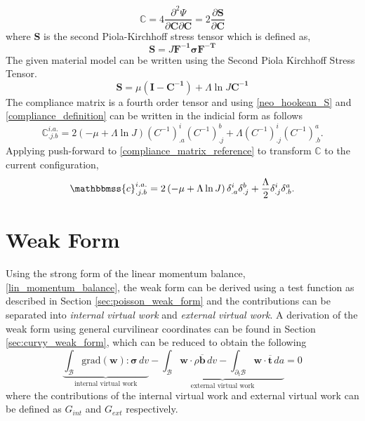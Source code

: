 \begin{equation} \label{compliance_definition}
    {\mathbb{C} = 4\frac{\partial^2 \Psi}{\partial\boldsymbol{C}\partial\boldsymbol{C}} = 2\frac{\partial\boldsymbol{S}}{\partial\boldsymbol{C}}}
\end{equation}
 where \textbf{S} is the second Piola-Kirchhoff stress tensor which is defined as,
\begin{equation}\label{eq:19}
    {\boldsymbol{S} = J \boldsymbol{F^{-1} \sigma F^{-T}}}
\end{equation}
The given material model can be written using the Second Piola Kirchhoff Stress Tensor.
\begin{equation}\label{neo_hookean_S}
    {\boldsymbol{S} = \mu\left(\boldsymbol{I} - \boldsymbol{C^{-1}}\right) + \Lambda\ln{J}\boldsymbol{C^{-1}}}
\end{equation}
The compliance matrix is a fourth order tensor and using \eqref{neo_hookean_S} and \eqref{compliance_definition} can be written in the indicial form as follows
\begin{equation}\label{compliance_matrix_reference}
    \mathbb{C}^{i.a.}_{.j.b} = 2\left(-\mu + \Lambda\ln{J}\right)\left(C^{-1}\right)^i_{.a} \left(C^{-1}\right)^b_{.j} + \Lambda \left(C^{-1}\right)^i_{.j} \left(C^{-1}\right)^a_{.b}.
\end{equation}
Applying push-forward to \eqref{compliance_matrix_reference} to transform $\mathbb{C}$ to the current configuration,
\begin{equation} \label{compliance_matrix_current}
    \mathbbmss{c}^{i.a.}_{.j.b} = 2\left(-\mu + \Lambda\ln{J}\right) \delta^i_{.a} \delta^b_{.j} + \frac{\Lambda}{2} \delta^i_{.j} \delta^a_{.b}.
\end{equation}

\section{Weak Form}
Using the strong form of the linear momentum balance, \eqref{lin_momentum_balance},
 the weak form can be derived using a test function as described in Section \ref{sec:poisson_weak_form} and the contributions can be 
 separated into \emph{internal virtual work} and \emph{external virtual work}. A derivation of the weak form using
 general curvilinear coordinates can be found in Section \ref{sec:curvy_weak_form}, which can be reduced to obtain the following 
\begin{equation} \label{weak_form_beam}
    \underbrace{\int_{\mathcal{B}} \mathrm{grad}(\boldsymbol{w}) : \boldsymbol{\sigma} \,dv}_{\text{internal virtual work}} - 
        \underbrace{\int_{\mathcal{B}} \boldsymbol{w}\cdot \rho \overline{\boldsymbol{b}} \,dv - \int_{\partial_{t}\mathcal{B}} \boldsymbol{w} \cdot \overline{\boldsymbol{t}} \,da}_{\text{external virtual work}} = 0
\end{equation}
where the contributions of the internal virtual work and external virtual work can be defined as $G_{int}$ and $G_{ext}$ respectively.

